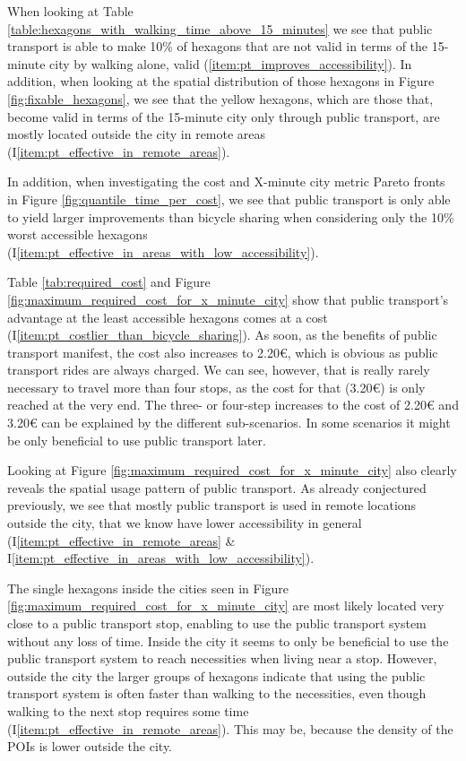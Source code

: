 When looking at Table \ref{table:hexagons_with_walking_time_above_15_minutes} we see that public transport is able to make 10\% of hexagons that are not valid in terms of the 15-minute city by walking alone, valid (\ref{item:pt_improves_accessibility}).
In addition, when looking at the spatial distribution of those hexagons in Figure \ref{fig:fixable_hexagons}, we see that the yellow hexagons, which are those that, become valid in terms of the 15-minute city only through public transport, are mostly located outside the city in remote areas (I\ref{item:pt_effective_in_remote_areas}).

In addition, when investigating the cost and X-minute city metric Pareto fronts in Figure \ref{fig:quantile_time_per_cost}, we see that public transport is only able to yield larger improvements than bicycle sharing when considering only the 10\% worst accessible hexagons (I\ref{item:pt_effective_in_areas_with_low_accessibility}).

Table \ref{tab:required_cost} and Figure \ref{fig:maximum_required_cost_for_x_minute_city} show that public transport's advantage at the least accessible hexagons comes at a cost (I\ref{item:pt_costlier_than_bicycle_sharing}).
As soon, as the benefits of public transport manifest, the cost also increases to 2.20€, which is obvious as public transport rides are always charged.
We can see, however, that is really rarely necessary to travel more than four stops, as the cost for that (3.20€) is only reached at the very end. 
The three- or four-step increases to the cost of 2.20€ and 3.20€ can be explained by the different sub-scenarios.
In some scenarios it might be only beneficial to use public transport later.

Looking at Figure \ref{fig:maximum_required_cost_for_x_minute_city} also clearly reveals the spatial usage pattern of public transport.
As already conjectured previously, we see that mostly public transport is used in remote locations outside the city, that we know have lower accessibility in general (I\ref{item:pt_effective_in_remote_areas} \& I\ref{item:pt_effective_in_areas_with_low_accessibility}).

The single hexagons inside the cities seen in Figure \ref{fig:maximum_required_cost_for_x_minute_city} are most likely located very close to a public transport stop, enabling to use the public transport system without any loss of time.
Inside the city it seems to only be beneficial to use the public transport system to reach necessities when living near a stop.
However, outside the city the larger groups of hexagons indicate that using the public transport system is often faster than walking to the necessities, even though walking to the next stop requires some time (I\ref{item:pt_effective_in_remote_areas}).
This may be, because the density of the POIs is lower outside the city.

